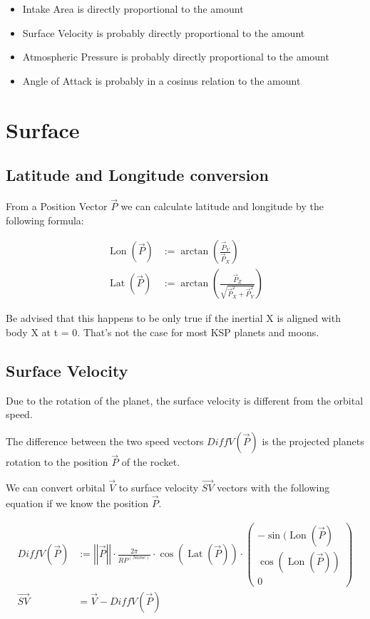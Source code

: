 \documentclass[11pt]{report}
\newcommand{\oa}[1]{\overrightarrow{#1}}
\newcommand{\Pos}{\oa{P}}
\newcommand{\Vel}{\oa{V}}
\newcommand{\absvec}[1]{\left|\left|{#1}\right|\right|}
\DeclareMathOperator{\Lat}{Lat}
\DeclareMathOperator{\Lon}{Lon}
\begin{document}
\begin{itemize}
\item Intake Area is directly proportional to the amount
\item Surface Velocity is probably directly proportional to the amount
\item Atmospheric Pressure is probably directly proportional to the
  amount
\item Angle of Attack is probably in a cosinus relation to the amount
\end{itemize}

\chapter {Surface}

\section{Latitude and Longitude conversion}

From a Position Vector $\Pos$ we can calculate 
latitude and  longitude by the following formula:

\begin{align}
  \Lon(\Pos) &:= \arctan\left(\frac{\Pos_Y}{\Pos_X}\right)\\
  \Lat(\Pos) &:= \arctan\left(\frac{\Pos_Z}{\sqrt{\Pos_X^2+\Pos_Y^2}}\right)
\end{align}

Be advised that this happens to be only true if the inertial X is
aligned with body X at t = 0. That's not the case for most KSP planets
and moons. \cite{LatLongNote}

\section{Surface Velocity}

Due to the rotation of the planet, the 
surface velocity is different from the orbital speed.

The difference between the two speed vectors $DiffV(\Pos)$ is the
projected planets rotation to the position $\Pos$ of the rocket.

We can convert orbital $\Vel$ to surface velocity $\oa{SV}$
vectors with the following equation if we know the position $\Pos$.

\begin{align}
  DiffV(\Pos) &:= \absvec{\Pos} \cdot \frac{2 \pi}{RP^{(Name)}} \cdot \cos\left(\Lat\left(\Pos\right)\right)\cdot\left(\begin{smallmatrix}-\sin(\Lon(\Pos)\\\cos(\Lon(\Pos))\\0\end{smallmatrix}\right)\nonumber\\
  \oa{SV} &= \Vel - DiffV(\Pos)
\end{align}
\end{document}
